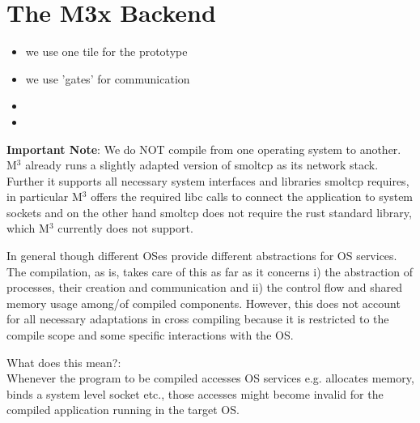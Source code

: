 \section{The M3x Backend}
\begin{itemize}
    \item we use one tile for the prototype
    \item we use 'gates' for communication
    \item {}
    \item {}
\end{itemize}

\textbf{Important Note}: We do NOT compile from one operating system to another. M$^3$ already runs a slightly adapted version of smoltcp as its network stack. Further it supports all necessary system interfaces and libraries smoltcp requires, in particular M$^3$ offers the required libc calls to connect the application to system sockets and on the other hand smoltcp does not require the rust standard library, which M$^3$ currently does not support. 

In general though different OSes provide different abstractions for OS services. The compilation, as is, takes care of this as far as it concerns i) the abstraction of processes, their creation and communication and ii) the control flow and shared memory usage among/of compiled components. However, this does not account for all necessary adaptations in cross compiling because it is restricted to the compile scope and some specific interactions with the OS. \\
\bigskip

What does this mean?:\\
Whenever the program to be compiled accesses OS services e.g. allocates memory, binds a system level socket etc., those accesses might become invalid for the compiled application running in the target OS.\\
\bigskip

